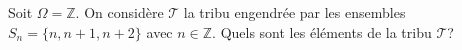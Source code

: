 \documentclass[../PolyS4.tex]{subfiles}
\begin{document}

























Soit $\Omega=\mathbb Z$. On considère $\mathcal T$ la tribu engendrée
par les ensembles $S_n=\{n,n+1,n+2\}$ avec $n\in\mathbb Z.$
Quels sont les éléments de la tribu $\mathcal T$?\\
\end{document}
